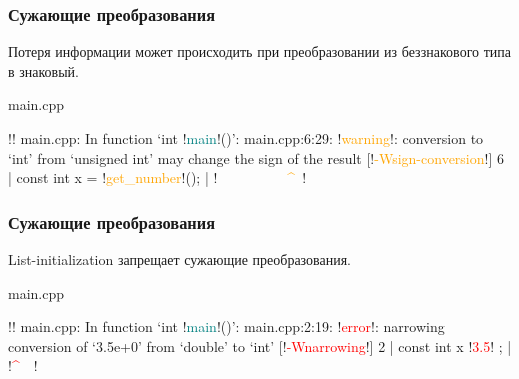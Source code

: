 \documentclass[compress, 8pt, aspectratio=169]{beamer}
\begin{document}
\begin{frame}[fragile]

    \frametitle{Сужающие преобразования}

    \hfill\break
    Потеря информации может происходить при преобразовании из беззнакового типа
    в знаковый.

        {main.cpp}

    \begin{terminalwindow}
!!
main.cpp: In function ‘int !\textcolor{teal}{main}!()’:
main.cpp:6:29: !\textcolor{orange}{warning}!: conversion to ‘int’ from ‘unsigned int’ may change the sign of the result [!\textcolor{orange}{-Wsign-conversion}!]
    6 |     const int x = !\textcolor{orange}{get\_number}!();
      |                   !\textcolor{orange}{~~~~~~~~~~\^{}~}!
    \end{terminalwindow}

\end{frame}

\begin{frame}[fragile]

    \frametitle{Сужающие преобразования}

    List-initialization запрещает сужающие преобразования.

        {main.cpp}

    \begin{terminalwindow}
!!
main.cpp: In function ‘int !\textcolor{teal}{main}!()’:
main.cpp:2:19: !\textcolor{red}{error}!: narrowing conversion of ‘3.5e+0’ from ‘double’ to ‘int’ [!\textcolor{red}{-Wnarrowing}!]
    2 |     const int x { !\textcolor{red}{3.5}! };
      |                   !\textcolor{red}{\^{}~~}!
    \end{terminalwindow}

\end{frame}
\end{document}
